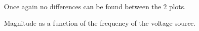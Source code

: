 \begin{figure}[H]
\hspace{-10mm}
  \caption{Magnitude as a function of the frequency of the voltage source.} 
  Once again no differences can be found between the 2 plots.
  
\end{figure}